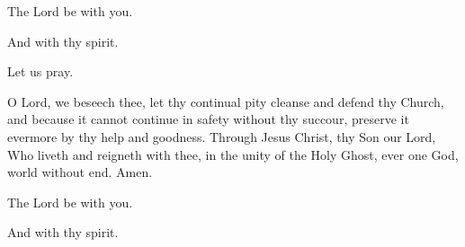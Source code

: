 


\rubric{\Vbar}The Lord be with you.

\rubric{\Rbar}And with thy spirit.

Let us pray.

O Lord, we beseech thee, let thy continual pity cleanse and defend thy Church, and because it cannot continue in safety without thy succour, preserve it evermore by thy help and goodness. Through Jesus Christ, thy Son our Lord, Who liveth and reigneth with thee, in the unity of the Holy Ghost, ever one God, world without end. \rubric{\Rbar} Amen.

\rubric{\Vbar}The Lord be with you.

\rubric{\Rbar}And with thy spirit.
